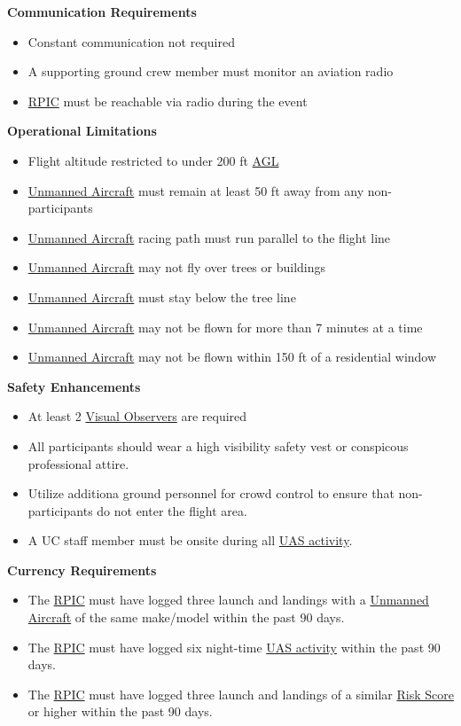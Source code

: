 \documentclass[
]{book}
\providecommand{\tightlist}{%
  \setlength{\itemsep}{0pt}\setlength{\parskip}{0pt}}
\begin{document}
\textbf{Communication Requirements}

\begin{itemize}
\tightlist
\item
  Constant communication not required
\item
  A supporting ground crew member must monitor an aviation radio
\item
  \protect\hyperlink{RPIC}{RPIC} must be reachable via radio during the event
\end{itemize}

\textbf{Operational Limitations}

\begin{itemize}
\tightlist
\item
  Flight altitude restricted to under 200 ft \protect\hyperlink{AGL}{AGL}
\item
  \protect\hyperlink{UA}{Unmanned Aircraft} must remain at least 50 ft away from any non-participants
\item
  \protect\hyperlink{UA}{Unmanned Aircraft} racing path must run parallel to the flight line
\item
  \protect\hyperlink{UA}{Unmanned Aircraft} may not fly over trees or buildings
\item
  \protect\hyperlink{UA}{Unmanned Aircraft} must stay below the tree line
\item
  \protect\hyperlink{UA}{Unmanned Aircraft} may not be flown for more than 7 minutes at a time
\item
  \protect\hyperlink{UA}{Unmanned Aircraft} may not be flown within 150 ft of a residential window
\end{itemize}

\textbf{Safety Enhancements}

\begin{itemize}
\tightlist
\item
  At least 2 \protect\hyperlink{VO}{Visual Observers} are required
\item
  All participants should wear a high visibility safety vest or conspicous professional attire.
\item
  Utilize additiona ground personnel for crowd control to ensure that non-participants do not enter the flight area.
\item
  A UC staff member must be onsite during all \protect\hyperlink{UASactivity}{UAS activity}.
\end{itemize}

\textbf{Currency Requirements}

\begin{itemize}
\tightlist
\item
  The \protect\hyperlink{RPIC}{RPIC} must have logged three launch and landings with a \protect\hyperlink{UA}{Unmanned Aircraft} of the same make/model within the past 90 days.
\item
  The \protect\hyperlink{RPIC}{RPIC} must have logged six night-time \protect\hyperlink{UASactivity}{UAS activity} within the past 90 days.
\item
  The \protect\hyperlink{RPIC}{RPIC} must have logged three launch and landings of a similar \protect\hyperlink{riskscore}{Risk Score} or higher within the past 90 days.
\end{itemize}
\end{document}
